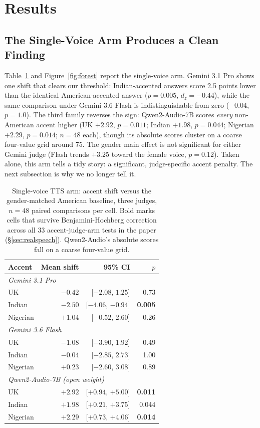 \section{Results}
\label{sec:results}

\subsection{The Single-Voice Arm Produces a Clean Finding}

Table~\ref{tab:axisa} and Figure~\ref{fig:forest} report the single-voice
arm. Gemini 3.1 Pro shows one shift that clears our threshold:
Indian-accented answers score 2.5 points lower than the identical
American-accented answer ($p=0.005$, $d_z=-0.44$), while the same comparison
under Gemini 3.6 Flash is indistinguishable from zero ($-0.04$, $p=1.0$).
The third family reverses the sign: Qwen2-Audio-7B scores \emph{every}
non-American accent higher (UK $+2.92$, $p=0.011$; Indian $+1.98$,
$p=0.044$; Nigerian $+2.29$, $p=0.014$; $n{=}48$ each), though its absolute
scores cluster on a coarse four-value grid around 75. The gender main
effect is not significant for either Gemini judge (Flash trends $+3.25$
toward the female voice, $p=0.12$). Taken alone, this arm tells a tidy
story: a significant, judge-specific accent penalty. The next subsection is
why we no longer tell it.

\begin{table}[t]
\centering
\small
\caption{Single-voice TTS arm: accent shift versus the gender-matched American baseline, three judges, $n=48$ paired comparisons per cell. Bold marks cells that survive Benjamini-Hochberg correction across all 33 accent-judge-arm tests in the paper (\S\ref{sec:realspeech}). Qwen2-Audio's absolute scores fall on a coarse four-value grid.}
\label{tab:axisa}
\begin{tabular}{lrrr}
\toprule
Accent & Mean shift & 95\% CI & $p$ \\
\midrule
\multicolumn{4}{l}{\emph{Gemini 3.1 Pro}} \\
UK      & $-0.42$ & [$-2.08$, $1.25$]  & 0.73 \\
Indian  & \textbf{$-2.50$} & [$-4.06$, $-0.94$] & \textbf{0.005} \\
Nigerian& $+1.04$ & [$-0.52$, $2.60$]  & 0.26 \\
\midrule
\multicolumn{4}{l}{\emph{Gemini 3.6 Flash}} \\
UK      & $-1.08$ & [$-3.90$, $1.92$]  & 0.49 \\
Indian  & $-0.04$ & [$-2.85$, $2.73$]  & 1.00 \\
Nigerian& $+0.23$ & [$-2.60$, $3.08$]  & 0.89 \\
\midrule
\multicolumn{4}{l}{\emph{Qwen2-Audio-7B (open weight)}} \\
UK      & \textbf{$+2.92$} & [$+0.94$, $+5.00$] & \textbf{0.011} \\
Indian  & $+1.98$ & [$+0.21$, $+3.75$] & 0.044 \\
Nigerian& \textbf{$+2.29$} & [$+0.73$, $+4.06$] & \textbf{0.014} \\
\bottomrule
\end{tabular}
\end{table}

